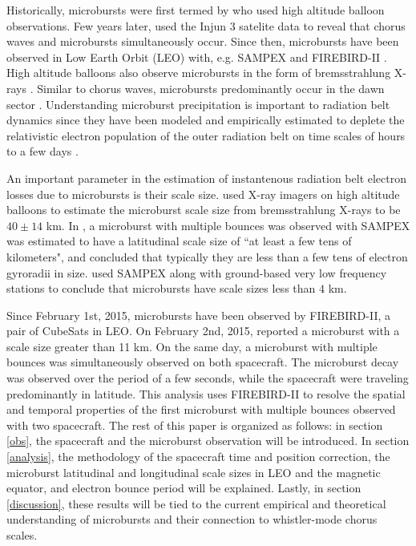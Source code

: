 \documentclass[draft,linenumbers]{agujournal}
\begin{document}
Historically, microbursts were first termed by \citet{Anderson1964} who used high altitude balloon observations. Few years later, \citet{Oliven1968} used the Injun 3 satelite data to reveal that chorus waves and microbursts simultaneously occur. Since then, microbursts have been observed in Low Earth Orbit (LEO) with, e.g. SAMPEX \citep{Nakamura95, Nakamura00, Blake96, Lorentzen01a, Lorentzen01b, O'Brien03, O'Brien04, Blum15} and FIREBIRD-II \citep{Crew16}. High altitude balloons also observe microbursts in the form of bremsstrahlung X-rays \citep{Parks1967, Woodger15, Anderson2017}. Similar to chorus waves, microbursts predominantly occur in the dawn sector \citep{Lorentzen01b}. Understanding microburst precipitation is important to radiation belt dynamics since they have been modeled and empirically estimated to deplete the relativistic electron population of the outer radiation belt on time scales of hours to a few days \citep{O'Brien04, Thorne05, Shprits07}. 

An important parameter in the estimation of instantenous radiation belt electron losses due to microbursts is their scale size. \citet{Parks1967} used X-ray imagers on high altitude balloons to estimate the microburst scale size from bremsstrahlung X-rays to be $40 \pm 14$ km. In \citet{Blake96}, a microburst with multiple bounces was observed with SAMPEX was estimated to have a latitudinal scale size of ``at least a few tens of kilometers", and concluded that typically they are less than a few tens of electron gyroradii in size. \citet{Dietrich10} used SAMPEX along with ground-based very low frequency stations to conclude that microbursts have scale sizes less than $4$ km.

Since February 1st, 2015, microbursts have been observed by FIREBIRD-II, a pair of CubeSats in LEO. On February 2nd, 2015, \citet{Crew16} reported a microburst with a scale size greater than 11 km. On the same day, a microburst with multiple bounces was simultaneously observed on both spacecraft. The microburst decay was observed over the period of a few seconds, while the spacecraft were traveling predominantly in latitude. This analysis uses FIREBIRD-II to resolve the spatial and temporal properties of the first microburst with multiple bounces observed with two spacecraft. The rest of this paper is organized as follows: in section \ref{obs}, the spacecraft and the microburst observation will be introduced. In section \ref{analysis}, the methodology of the spacecraft time and position correction, the microburst latitudinal and longitudinal scale sizes in LEO and the magnetic equator, and electron bounce period will be explained. Lastly, in section \ref{discussion}, these results will be tied to the current empirical and theoretical understanding of microbursts and their connection to whistler-mode chorus scales.
\end{document}
